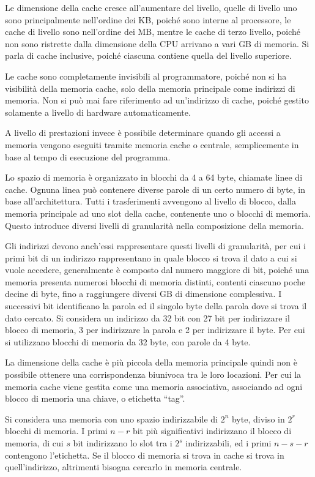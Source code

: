 \documentclass{article}
\numberwithin{equation}{subsection}
\begin{document}
Le dimensione della cache cresce all'aumentare del livello, quelle di livello uno sono principalmente nell'ordine dei KB, poiché sono interne al processore, le cache di 
livello sono nell'ordine dei MB, mentre le cache di terzo livello, poiché non sono ristrette dalla dimensione della CPU arrivano a vari GB di memoria. 
Si parla di cache inclusive, poiché ciascuna contiene quella del livello superiore. 

Le cache sono completamente invisibili al programmatore, poiché non si ha visibilità della memoria cache, solo della memoria principale come indirizzi di memoria. Non si 
può mai fare riferimento ad un'indirizzo di cache, poiché gestito solamente a livello di hardware automaticamente. 

A livello di prestazioni invece è possibile determinare quando gli accessi a memoria vengono eseguiti tramite memoria cache o centrale, semplicemente in base al tempo di 
esecuzione del programma. 

Lo spazio di memoria è organizzato in blocchi da 4 a 64 byte, chiamate linee di cache. Ognuna linea può contenere diverse parole di un certo numero di byte, in base 
all'architettura. Tutti i trasferimenti avvengono al livello di blocco, dalla memoria principale ad uno slot della cache, contenente uno o blocchi di memoria. 
Questo introduce diversi livelli di granularità nella composizione della memoria. 

Gli indirizzi devono anch'essi rappresentare questi livelli di granularità, per cui i primi bit di un indirizzo rappresentano in quale blocco si trova il dato a cui si vuole 
accedere, generalmente è composto dal numero maggiore di bit, poiché una memoria presenta numerosi blocchi di memoria distinti, contenti ciascuno poche decine di byte, fino 
a raggiungere diversi GB di dimensione complessiva. I successivi bit identificano la parola ed il singolo byte della parola dove si trova il dato cercato. 
Si considera un indirizzo da 32 bit con 27 bit per indirizzare il blocco di memoria, 3 per indirizzare la parola e 2 per indirizzare il byte. Per cui si utilizzano blocchi 
di memoria da 32 byte, con parole da 4 byte. 


La dimensione della cache è più piccola della memoria principale quindi non è possibile ottenere una corrispondenza biunivoca tra le loro locazioni. Per cui la memoria 
cache viene gestita come una memoria associativa, associando ad ogni blocco di memoria una chiave, o etichetta ``tag''. 

Si considera una memoria con uno spazio indirizzabile di $2^n$ byte, diviso in $2^r$ blocchi di memoria. I primi $n-r$ bit più significativi 
indirizzano il blocco di memoria, di cui $s$ bit indirizzano lo slot tra i $2^s$ indirizzabili, ed i primi $n-s-r$ contengono l'etichetta.   
Se il blocco di memoria si trova in cache si trova in quell'indirizzo, altrimenti bisogna cercarlo in memoria centrale. 
\end{document}
